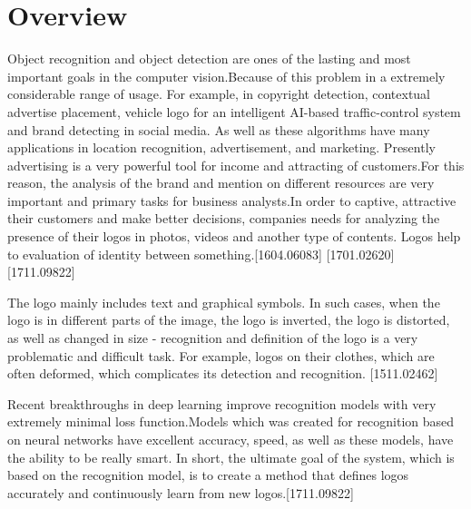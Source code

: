 \section{Overview} \label{sec:1.1}
\vspace{-0.5cm}
\par Object recognition and object detection are ones of the lasting and most important goals in the computer vision.Because of this problem in a extremely considerable range of usage. For example, in copyright detection, contextual advertise placement, vehicle logo for an intelligent AI-based traffic-control system and brand detecting in social media. As well as these algorithms have many applications in location recognition, advertisement, and marketing. Presently advertising is a very powerful tool for income and attracting of customers.For this reason, the analysis of the brand and mention on different resources are very important and primary tasks for business analysts.In order to captive, attractive their customers and make better decisions, companies needs for analyzing the presence of their logos in photos, videos and another type of contents. Logos help to evaluation of identity between something.[1604.06083] [1701.02620] [1711.09822]

\vspace{-0.5cm}
\par The logo mainly includes text and graphical symbols. In such cases, when the logo is in different parts of the image, the logo is inverted, the logo is distorted, as well as changed in size - recognition and definition of the logo is a very problematic and difficult task. For example, logos on their clothes, which are often deformed, which complicates its detection and recognition. [1511.02462]

\vspace{-0.5cm}
\par Recent breakthroughs in deep learning improve recognition models with very extremely minimal loss function.Models which was created for recognition based on neural networks have excellent accuracy, speed, as well as these models, have the ability to be really smart. In short, the ultimate goal of the system, which is based on the recognition model, is to create a method that defines logos accurately and continuously learn from new logos.[1711.09822]

\vspace{-0.3cm}
